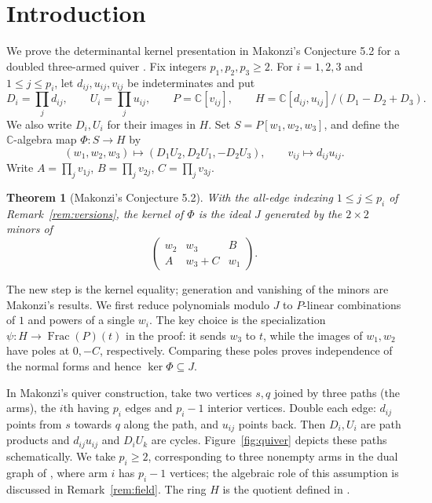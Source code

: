\documentclass[11pt]{article}
\newtheorem{theorem}{Theorem}
\theoremstyle{remark}
\newcommand{\CC}{\mathbb C}
\DeclareMathOperator{\Frac}{Frac}
\begin{document}
\section{Introduction}
We prove the determinantal kernel presentation in Makonzi's
Conjecture 5.2 for a doubled three-armed quiver \cite{Makonzi}.
Fix integers $p_1,p_2,p_3\ge2$. For $i=1,2,3$ and $1\le j\le p_i$,
let $d_{ij},u_{ij},v_{ij}$ be indeterminates and put
\[
 D_i=\prod_jd_{ij},\qquad U_i=\prod_ju_{ij},\qquad
 P=\CC[v_{ij}],\qquad H=\CC[d_{ij},u_{ij}]/(D_1-D_2+D_3).
\]
We also write $D_i,U_i$ for their images in $H$.
Set $S=P[w_1,w_2,w_3]$, and define the $\CC$-algebra map $\Phi:S\to H$ by
\[
 (w_1,w_2,w_3)\longmapsto(D_1U_2,D_2U_1,-D_2U_3),\qquad
 v_{ij}\longmapsto d_{ij}u_{ij}.
\]
Write
$A=\prod_jv_{1j}$, $B=\prod_jv_{2j}$, $C=\prod_jv_{3j}$.
\begin{theorem}[Makonzi's Conjecture 5.2]\label{thm:main}
With the all-edge indexing $1\le j\le p_i$ of
Remark~\ref{rem:versions}, the kernel of $\Phi$ is the ideal $J$ generated
by the $2\times2$ minors of
\[
 \begin{pmatrix}w_2&w_3&B\\ A&w_3+C&w_1\end{pmatrix}.
\]
\end{theorem}
The new step is the kernel equality; generation and vanishing of the
minors are Makonzi's results. We first reduce polynomials modulo $J$ to
$P$-linear combinations of $1$ and powers of a single $w_i$.
The key choice is the specialization $\psi:H\to\Frac(P)(t)$ in the proof:
it sends $w_3$ to $t$, while the images of $w_1,w_2$ have poles at
$0,-C$, respectively. Comparing these poles proves independence of the
normal forms and hence $\ker\Phi\subseteq J$.

In Makonzi's quiver construction, take two vertices $s,q$ joined
by three paths (the arms), the $i$th having $p_i$ edges and
$p_i-1$ interior vertices.
Double each edge: $d_{ij}$ points from $s$ towards $q$ along the path,
and $u_{ij}$ points back.
Then $D_i,U_i$ are path products and $d_{ij}u_{ij}$ and $D_iU_k$ are
cycles. Figure~\ref{fig:quiver} depicts these paths schematically.
We take $p_i\ge2$, corresponding to three nonempty arms in the dual graph of \cite[\S2]{Makonzi}, where arm $i$ has $p_i-1$ vertices; the algebraic role of this assumption is discussed in Remark~\ref{rem:field}.
The ring $H$ is the quotient defined in \cite[Eq.~(3.1)]{Makonzi}.
\end{document}
